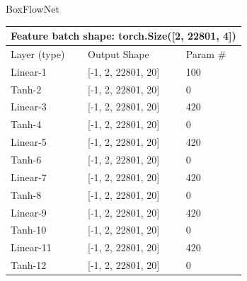 \documentclass{article}
\begin{document}
\centerline{BoxFlowNet}
\begin{table}[H]
	\centering
	\begin{tabular}{lll}
		\hline
		\multicolumn{3}{|c|}{Feature batch shape:
		torch.Size({[}2, 22801, 4{]})}
		\\ \hline
		\multicolumn{1}{|l|}{Layer (type)}           &
		\multicolumn{1}{l|}{Output Shape}            & \multicolumn{1}{l|}{Param \#} \\
		\hline
		\multicolumn{1}{|l|}{Linear-1}               &
		\multicolumn{1}{l|}{{[}-1, 2, 22801, 20{]}}  & \multicolumn{1}{l|}{100}      \\
		\hline
		\multicolumn{1}{|l|}{Tanh-2}                 &
		\multicolumn{1}{l|}{{[}-1, 2, 22801, 20{]}}  & \multicolumn{1}{l|}{0}        \\
		\hline
		\multicolumn{1}{|l|}{Linear-3}               &
		\multicolumn{1}{l|}{{[}-1, 2, 22801, 20{]}}  & \multicolumn{1}{l|}{420}      \\
		\hline
		\multicolumn{1}{|l|}{Tanh-4}                 &
		\multicolumn{1}{l|}{{[}-1, 2, 22801, 20{]}}  & \multicolumn{1}{l|}{0}        \\
		\hline
		\multicolumn{1}{|l|}{Linear-5}               &
		\multicolumn{1}{l|}{{[}-1, 2, 22801, 20{]}}  & \multicolumn{1}{l|}{420}      \\
		\hline
		\multicolumn{1}{|l|}{Tanh-6}                 &
		\multicolumn{1}{l|}{{[}-1, 2, 22801, 20{]}}  & \multicolumn{1}{l|}{0}        \\
		\hline
		\multicolumn{1}{|l|}{Linear-7}               &
		\multicolumn{1}{l|}{{[}-1, 2, 22801, 20{]}}  & \multicolumn{1}{l|}{420}      \\
		\hline
		\multicolumn{1}{|l|}{Tanh-8}                 &
		\multicolumn{1}{l|}{{[}-1, 2, 22801, 20{]}}  & \multicolumn{1}{l|}{0}        \\
		\hline
		\multicolumn{1}{|l|}{Linear-9}               &
		\multicolumn{1}{l|}{{[}-1, 2, 22801, 20{]}}  & \multicolumn{1}{l|}{420}      \\
		\hline
		\multicolumn{1}{|l|}{Tanh-10}                &
		\multicolumn{1}{l|}{{[}-1, 2, 22801, 20{]}}  & \multicolumn{1}{l|}{0}        \\
		\hline
		\multicolumn{1}{|l|}{Linear-11}              &
		\multicolumn{1}{l|}{{[}-1, 2, 22801, 20{]}}  & \multicolumn{1}{l|}{420}      \\
		\hline
		\multicolumn{1}{|l|}{Tanh-12}                &
		\multicolumn{1}{l|}{{[}-1, 2, 22801, 20{]}}  & \multicolumn{1}{l|}{0}        \\

\end{tabular}
\end{table}
\end{document}
